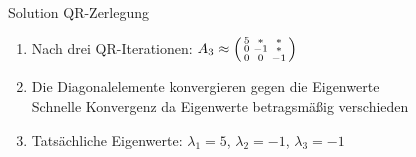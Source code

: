 \begin{KR}{Solution QR-Zerlegung}
\begin{enumerate}
    \item Nach drei QR-Iterationen:
    $A_3 \approx \begin{psmallmatrix}
    5 & * & *\\
    0 & -1 & *\\
    0 & 0 & -1
    \end{psmallmatrix}$
    
    \item Die Diagonalelemente konvergieren gegen die Eigenwerte\\
    Schnelle Konvergenz da Eigenwerte betragsmäßig verschieden
    
    \item Tatsächliche Eigenwerte:
    $\lambda_1 = 5$,
    $\lambda_2 = -1$,
    $\lambda_3 = -1$
\end{enumerate}
\end{KR}




